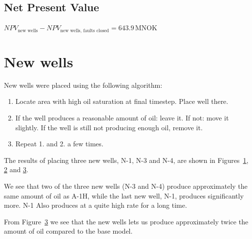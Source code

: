 \documentclass[final]{beamer}
\begin{document}
\begin{frame}[t]
\begin{multicols}{3}
\subsection{Net Present Value} %
\begin{center}
  $NPV_{\text{new wells}} - NPV_{\text{new wells, faults closed}}  = 643.9 \, \mathrm{MNOK}$
\end{center}







\section{New wells}
New wells were placed using the following algorithm:
\begin{enumerate}
  \item Locate area with high oil saturation at final timestep. Place well there.
  \item If the well produces a reasonable amount of oil: leave it. If not: move it slightly. If the well is still not producing enough oil, remove it.
  \item Repeat 1. and 2. a few times.
\end{enumerate}
The results of placing three new wells, N-1, N-3 and N-4, are shown in Figures~\ref{fig:new_wells_wopt}, \ref{fig:new_wells_wopr} and \ref{fig:new_wells_field}.

We see that two of the three new wells (N-3 and N-4) produce approximately the same amount of oil as A-1H, while the last new well, N-1, produces significantly more. N-1 Also produces at a quite high rate for a long time.

From Figure~\ref{fig:new_wells_field} we see that the new wells lets us produce approximately twice the amount of oil compared to the base model.

\begin{figure}[H]
  \hspace{-5ex}
  \caption{}
  \label{fig:new_wells_wopt}
\end{figure}

\begin{figure}[H]
  \hspace{-5ex}
  \caption{}
  \label{fig:new_wells_wopr}
\end{figure}


\begin{figure}[H]
  
  \caption{}
  \label{fig:new_wells_field}
\end{figure}



\end{multicols}
\end{frame}
\end{document}
